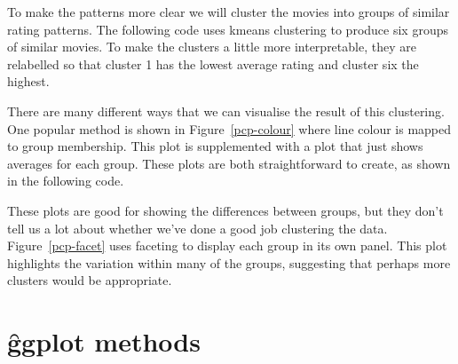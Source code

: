 {To make the patterns more clear we will cluster the movies into groups of similar rating patterns. The following code uses kmeans clustering \citep{hartigan:1979} to produce six groups of similar movies.  To make the clusters a little more interpretable, they are relabelled so that cluster 1 has the lowest average rating and cluster six the highest.

% 


There are many different ways that we can visualise the result of this clustering. One popular method is shown in Figure~\ref{pcp-colour} where line colour is mapped to group membership. This plot is supplemented with a plot that just shows averages for each group. These plots are both straightforward to create, as shown in the following code.

% 


These plots are good for showing the differences between groups, but they don't tell us a lot about whether we've done a good job clustering the data.  Figure~\ref{pcp-facet} uses faceting to display each group in its own panel. This plot highlights the variation within many of the groups, suggesting that perhaps more clusters would be appropriate.

% 



\section{\f{ggplot} methods}
\label{sec:methods}

}
